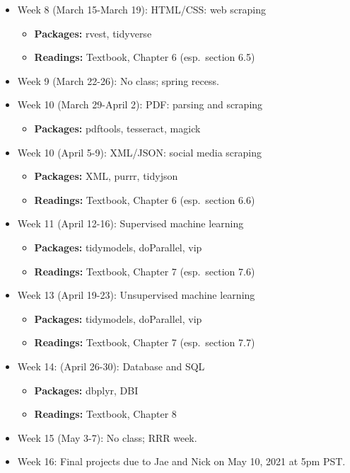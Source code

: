 \documentclass[
]{article}
\providecommand{\tightlist}{%
  \setlength{\itemsep}{0pt}\setlength{\parskip}{0pt}}
\begin{document}
\begin{itemize}
\item
  Week 8 (March 15-March 19): HTML/CSS: web scraping

  \begin{itemize}
  \tightlist
  \item
    \textbf{Packages:} rvest, tidyverse
  \item
    \textbf{Readings:} Textbook, Chapter 6 (esp.~section 6.5)
  \end{itemize}
\item
  Week 9 (March 22-26): No class; spring recess.
\item
  Week 10 (March 29-April 2): PDF: parsing and scraping

  \begin{itemize}
  \tightlist
  \item
    \textbf{Packages:} pdftools, tesseract, magick
  \end{itemize}
\item
  Week 10 (April 5-9): XML/JSON: social media scraping

  \begin{itemize}
  \tightlist
  \item
    \textbf{Packages:} XML, purrr, tidyjson
  \item
    \textbf{Readings:} Textbook, Chapter 6 (esp.~section 6.6)
  \end{itemize}
\item
  Week 11 (April 12-16): Supervised machine learning

  \begin{itemize}
  \tightlist
  \item
    \textbf{Packages:} tidymodels, doParallel, vip
  \item
    \textbf{Readings:} Textbook, Chapter 7 (esp.~section 7.6)
  \end{itemize}
\item
  Week 13 (April 19-23): Unsupervised machine learning

  \begin{itemize}
  \tightlist
  \item
    \textbf{Packages:} tidymodels, doParallel, vip
  \item
    \textbf{Readings:} Textbook, Chapter 7 (esp.~section 7.7)
  \end{itemize}
\item
  Week 14: (April 26-30): Database and SQL

  \begin{itemize}
  \tightlist
  \item
    \textbf{Packages:} dbplyr, DBI
  \item
    \textbf{Readings:} Textbook, Chapter 8
  \end{itemize}
\item
  Week 15 (May 3-7): No class; RRR week.
\item
  Week 16: Final projects due to Jae and Nick on May 10, 2021 at 5pm
  PST.
\end{itemize}
\end{document}
